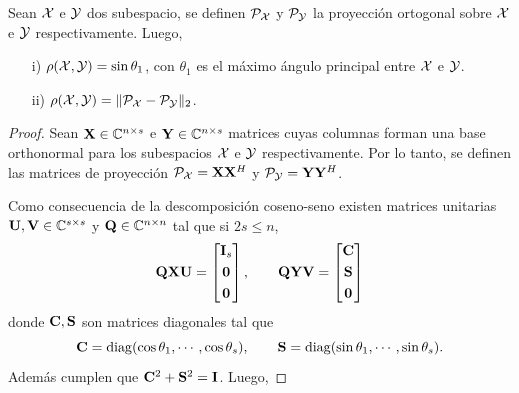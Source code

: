 	\begin{prop}\label{Prop:GapDistance}
		Sean $\mathcal{X}$ e $\mathcal{Y}$ dos subespacio, se definen $\mathcal{P}_{\mathcal{X}}$ y $\mathcal{P}_{\mathcal{Y}}$ la proyección ortogonal sobre $\mathcal{X}$ e $\mathcal{Y}$ respectivamente. Luego,
		\begin{itemize}
			\item[i)] $\rho(\mathcal{X},\mathcal{Y})=\sin\theta_1$, con $\theta_1$ es el máximo ángulo principal entre $\mathcal{X}$ e $\mathcal{Y}$.
			\item[ii)] $\rho(\mathcal{X},\mathcal{Y}) = \|\mathcal{P}_{\mathcal{X}}-\mathcal{P}_{\mathcal{Y}}\|_2$.
		\end{itemize} 
	\end{prop}
	\begin{proof}
        Sean  $\mathbf{X}\in\mathbb{C}^{n\times s}$ e $\mathbf{Y}\in\mathbb{C}^{n\times s}$ matrices cuyas columnas forman una base orthonormal para los subespacios $\mathcal{X}$ e $\mathcal{Y}$ respectivamente. Por lo tanto, se definen las matrices de proyección $\mathcal{P}_{\mathcal{X}} = \mathbf{X}\mathbf{X}^H$ y $\mathcal{P}_{\mathcal{Y}} = \mathbf{Y}\mathbf{Y}^H$.
        
        Como consecuencia de la descomposición coseno-seno \cite{Stewart1990} existen matrices unitarias $\mathbf{U},\mathbf{V}\in\mathbb{C}^{s\times s}$ y $\mathbf{Q}\in\mathbb{C}^{n\times n}$ tal que si $2s\le n$,
            \[\mathbf{Q}\mathbf{X}\mathbf{U} = \begin{bmatrix} \mathbf{I}_s\\[0.3em] \mathbf{0}\\[0.3em]\mathbf{0}\end{bmatrix},\qquad \mathbf{Q}\mathbf{Y}\mathbf{V} = \begin{bmatrix}\mathbf{C}\\[0.3em] \mathbf{S}\\[0.3em] \mathbf{0}\end{bmatrix}\]
            donde $\mathbf{C}, \mathbf{S}$ son matrices diagonales tal que \[\mathbf{C} = \mathrm{diag}(\cos\theta_1,\cdots,\cos\theta_s), \qquad \mathbf{S} = \mathrm{diag}(\sin\theta_1,\cdots,\sin\theta_s).\] Además cumplen que $\mathbf{C}^2+\mathbf{S}^2=\mathbf{I}$. Luego,


\end{proof}
